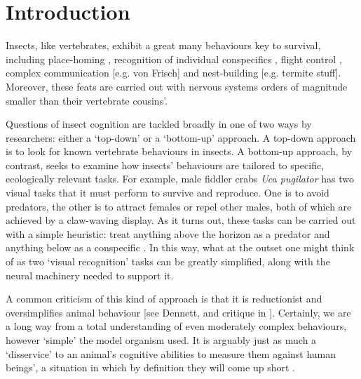\section{Introduction}

Insects, like vertebrates, exhibit a great many behaviours key to survival, including place-homing \cite{Ofstad2011}, recognition of individual conspecifics \cite{Sheehan2008}, flight control \cite{Taylor2001,Gotz1987}, complex communication [e.g. von Frisch] and nest-building [e.g. termite stuff].
Moreover, these feats are carried out with nervous systems orders of magnitude smaller than their vertebrate cousins'.

Questions of insect cognition are tackled broadly in one of two ways by researchers: either a `top-down' or a `bottom-up' approach.
A top-down approach is to look for known vertebrate behaviours in insects.
A bottom-up approach, by contrast, seeks to examine how insects' behaviours are tailored to specific, ecologically relevant tasks.
For example, male fiddler crabs \emph{Uca pugilator} has two visual tasks that it must perform to survive and reproduce.
One is to avoid predators, the other is to attract females or repel other males, both of which are achieved by a claw-waving display.
As it turns out, these tasks can be carried out with a simple heuristic: treat anything above the horizon as a predator and anything below as a conspecific \cite{Layne1997}.
In this way, what at the outset one might think of as two `visual recognition' tasks can be greatly simplified, along with the neural machinery needed to support it.

A common criticism of this kind of approach is that it is reductionist and oversimplifies animal behaviour [see Dennett, and critique in \cite{Shettleworth2010}].
Certainly, we are a long way from a total understanding of even moderately complex behaviours, however `simple' the model organism used.
It is arguably just as much a `disservice' to an animal's cognitive abilities to measure them against human beings', a situation in which by definition they will come up short \cite{Doring2011}.

